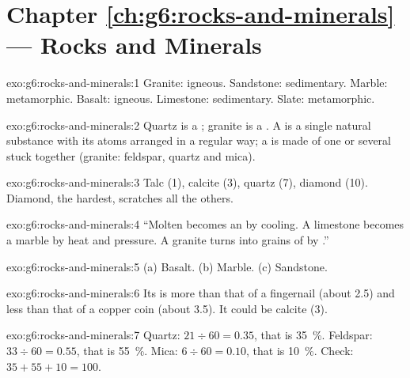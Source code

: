 \section*{Chapter \ref{ch:g6:rocks-and-minerals} --- Rocks and Minerals}

\begin{solution}{exo:g6:rocks-and-minerals:1}
Granite: igneous. Sandstone: sedimentary. Marble: metamorphic. Basalt:
igneous. Limestone: sedimentary. Slate: metamorphic.
\end{solution}

\begin{solution}{exo:g6:rocks-and-minerals:2}
Quartz is a ; granite is a . A  is a single natural
substance with its atoms arranged in a regular way; a  is made of one
or several  stuck together (granite: feldspar, quartz and mica).
\end{solution}

\begin{solution}{exo:g6:rocks-and-minerals:3}
Talc (1), calcite (3), quartz (7), diamond (10). Diamond, the hardest,
scratches all the others.
\end{solution}

\begin{solution}{exo:g6:rocks-and-minerals:4}
``Molten  becomes an  by cooling. A limestone becomes a
marble by heat and pressure. A granite turns into grains of  by
.''
\end{solution}

\begin{solution}{exo:g6:rocks-and-minerals:5}
(a) Basalt. (b) Marble. (c) Sandstone.
\end{solution}

\begin{solution}{exo:g6:rocks-and-minerals:6}
Its  is more than that of a fingernail (about 2.5) and less than
that of a copper coin (about 3.5). It could be calcite (3).
\end{solution}

\begin{solution}{exo:g6:rocks-and-minerals:7}
Quartz: $21 \div 60 = 0.35$, that is 35~\%. Feldspar: $33 \div 60 = 0.55$,
that is 55~\%. Mica: $6 \div 60 = 0.10$, that is 10~\%. Check:
$35 + 55 + 10 = 100$.
\end{solution}

